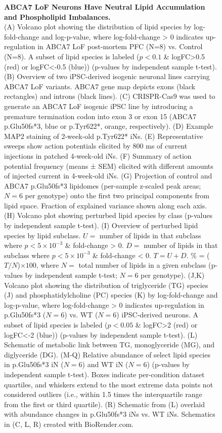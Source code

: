 \begin{figure}[ht]
    \centering
    \caption{
        \textbf{ABCA7 LoF Neurons Have Neutral Lipid Accumulation and Phospholipid Imbalances.}\\[1ex]
        (A) Volcano plot showing the distribution of lipid species by log-fold-change and log-p-value, where log-fold-change > 0 indicates up-regulation in ABCA7 LoF post-mortem PFC (N=8) vs. Control (N=8). A subset of lipid species is labeled ($p<0.1$ \& logFC>0.5 (red) or logFC<-0.5 (blue)) (p-values by independent sample t-test). 
        (B) Overview of two iPSC-derived isogenic neuronal lines carrying ABCA7 LoF variants. ABCA7 gene map depicts exons (black rectangles) and introns (black lines). 
        (C) CRISPR-Cas9 was used to generate an ABCA7 LoF isogenic iPSC line by introducing a premature termination codon into exon 3 or exon 15 (ABCA7 p.Glu50fs*3, blue or p.Tyr622*, orange, respectively). 
        (D) Example MAP2 staining of 2-week-old p.Tyr622* iNs. 
        (E) Representative sweeps show action potentials elicited by 800 ms of current injections in patched 4-week-old iNs. 
        (F) Summary of action potential frequency (means ± SEM) elicited with different amounts of injected current in 4-week-old iNs. 
        (G) Projection of control and ABCA7 p.Glu50fs*3 lipidomes (per-sample z-scaled peak areas; $N=6$ per genotype) onto the first two principal components from lipid space. Fraction of explained variance shown along each axis. 
        (H) Volcano plot showing perturbed lipid species by class (p-values by independent sample t-test). 
        (I) Overview of perturbed lipid species by lipid subclass. $U =$ number of lipids in that subclass where $p<5 \times 10^{-3}$ \& fold-change > 0. $D =$ number of lipids in that subclass where $p<5 \times 10^{-3}$ \& fold-change < 0. $T = U + D$. \% = ($T/N$)$\times 100$, where $N =$ total number of lipids in a given subclass (p-values by independent sample t-test; $N=6$ per genotype). (J,K) Volcano plot showing the distribution of triglyceride (TG) species 
        (J) and phosphatidylcholine (PC) species (K) by log-fold-change and log-p-value, where log-fold-change > 0 indicates up-regulation in p.Glu50fs*3 ($N=6$) vs. WT ($N=6$) iPSC-derived neurons. A subset of lipid species is labeled ($p<0.05$ \& logFC>2 (red) or logFC<-2 (blue)) (p-values by independent sample t-test). 
        (L) Schematic of metabolic link between TG, monoglyceride (MG), and diglyceride (DG). 
        (M-Q) Relative abundance of select lipid species in p.Glu50fs*3 iN ($N=6$) and WT iN ($N=6$) (p-values by independent sample t-test). Boxes indicate per-condition dataset quartiles, and whiskers extend to the most extreme data points not considered outliers (i.e., within 1.5 times the interquartile range from the first or third quartile). (R) Schematic from (L) overlaid with abundance changes in p.Glu50fs*3 iNs vs. WT iNs. Schematics in (C, L, R) created with BioRender.com.
    }
    \label{fig:main_lipids}
\end{figure}

